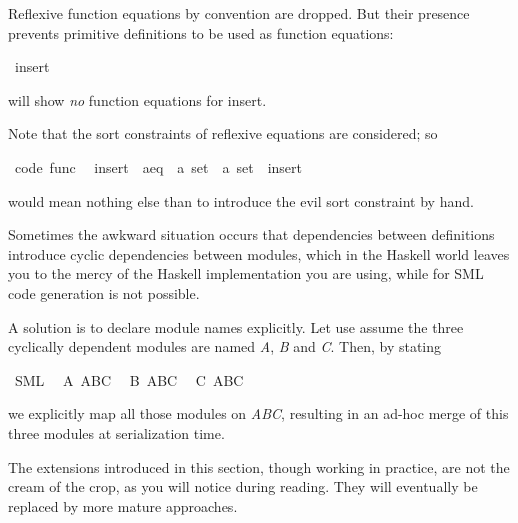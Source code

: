 \begin{isabellebody}
\begin{isamarkuptext}
  Reflexive function equations by convention are dropped.
  But their presence prevents primitive definitions to be
  used as function equations:%
\end{isamarkuptext}%
\isamarkuptrue%
\isamarkupfalse%
\ {\isacharparenleft}insert{\isacharparenright}%
\begin{isamarkuptext}%
will show \emph{no} function equations for insert.

  Note that the sort constraints of reflexive equations
  are considered; so%
\end{isamarkuptext}%
\isamarkuptrue%
\isamarkupfalse%
\ {\isacharbrackleft}code\ func{\isacharbrackright}{\isacharcolon}\isanewline
\ \ {\isachardoublequoteopen}{\isacharparenleft}insert\ {\isasymColon}\ {\isacharprime}a{\isasymColon}eq\ {\isasymRightarrow}\ {\isacharprime}a\ set\ {\isasymRightarrow}\ {\isacharprime}a\ set{\isacharparenright}\ {\isacharequal}\ insert{\isachardoublequoteclose}%
\isadelimproof
\ %
\endisadelimproof
%
\isatagproof
\isacommand{{\isachardot}{\isachardot}}\isamarkupfalse%
%
\endisatagproof
{\isafoldproof}%
%
\isadelimproof
%
\endisadelimproof
%
\begin{isamarkuptext}%
would mean nothing else than to introduce the evil
  sort constraint by hand.%
\end{isamarkuptext}%
\isamarkuptrue%
%
\isamarkuptrue%
%
\begin{isamarkuptext}%
Sometimes the awkward situation occurs that dependencies
  between definitions introduce cyclic dependencies
  between modules, which in the Haskell world leaves
  you to the mercy of the Haskell implementation you are using,
  while for SML code generation is not possible.

  A solution is to declare module names explicitly.
  Let use assume the three cyclically dependent
  modules are named \emph{A}, \emph{B} and \emph{C}.
  Then, by stating%
\end{isamarkuptext}%
\isamarkuptrue%
\isamarkupfalse%
\ SML\isanewline
\ \ A\ ABC\isanewline
\ \ B\ ABC\isanewline
\ \ C\ ABC%
\begin{isamarkuptext}%
we explicitly map all those modules on \emph{ABC},
  resulting in an ad-hoc merge of this three modules
  at serialization time.%
\end{isamarkuptext}%
\isamarkuptrue%
%
\isamarkuptrue%
%
\begin{isamarkuptext}%
\begin{warn}
    The extensions introduced in this section, though working
    in practice, are not the cream of the crop, as you
    will notice during reading.  They will
    eventually be replaced by more mature approaches.
  \end{warn}


\end{isamarkuptext}
\end{isabellebody}
